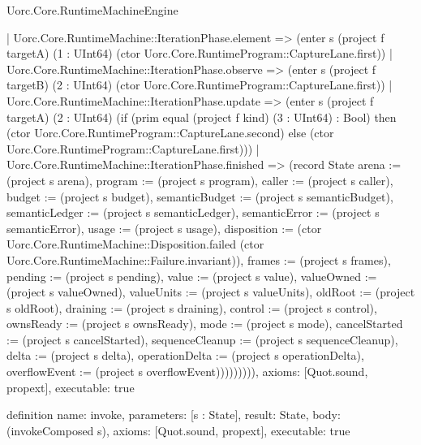 \begin{lexlean}{Uorc.Core.RuntimeMachineEngine}
\begin{semanticmodule}
{        | Uorc.Core.RuntimeMachine::IterationPhase.element => (enter s (project f targetA) (1 : UInt64) (ctor Uorc.Core.RuntimeProgram::CaptureLane.first))
        | Uorc.Core.RuntimeMachine::IterationPhase.observe => (enter s (project f targetB) (2 : UInt64) (ctor Uorc.Core.RuntimeProgram::CaptureLane.first))
        | Uorc.Core.RuntimeMachine::IterationPhase.update => (enter s (project f targetA) (2 : UInt64) (if (prim equal (project f kind) (3 : UInt64) : Bool) then (ctor Uorc.Core.RuntimeProgram::CaptureLane.second) else (ctor Uorc.Core.RuntimeProgram::CaptureLane.first)))
        | Uorc.Core.RuntimeMachine::IterationPhase.finished => (record State {arena := (project s arena), program := (project s program), caller := (project s caller), budget := (project s budget), semanticBudget := (project s semanticBudget), semanticLedger := (project s semanticLedger), semanticError := (project s semanticError), usage := (project s usage), disposition := (ctor Uorc.Core.RuntimeMachine::Disposition.failed (ctor Uorc.Core.RuntimeMachine::Failure.invariant)), frames := (project s frames), pending := (project s pending), value := (project s value), valueOwned := (project s valueOwned), valueUnits := (project s valueUnits), oldRoot := (project s oldRoot), draining := (project s draining), control := (project s control), ownsReady := (project s ownsReady), mode := (project s mode), cancelStarted := (project s cancelStarted), sequenceCleanup := (project s sequenceCleanup), delta := (project s delta), operationDelta := (project s operationDelta), overflowEvent := (project s overflowEvent)})))))))),
  axioms: [Quot.sound, propext],
  executable: true
}

definition{
  name: invoke,
  parameters: [s : State],
  result: State,
  body: (invokeComposed s),
  axioms: [Quot.sound, propext],
  executable: true
}


\end{semanticmodule}
\end{lexlean}
